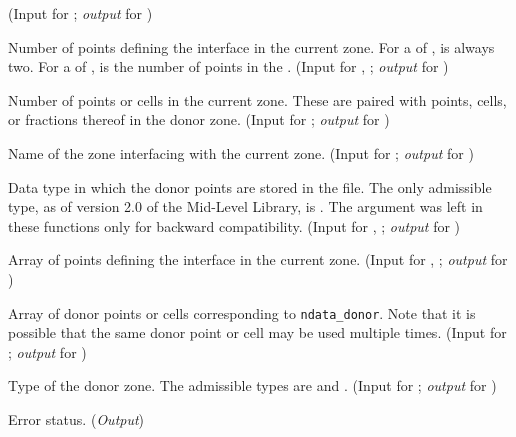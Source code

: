\begin{Ventryi}{}
      (\textcolor{input}{Input} for ;
      \textcolor{output}{\textit{output}} for )
\item [\fort{npnts}]
      Number of points defining the interface in the current zone.
      For a  of , 
      is always two.
      For a  of ,  is
      the number of points in the .
      (\textcolor{input}{Input} for ,
      ;
      \textcolor{output}{\textit{output}} for )
\item [\fort{ndata\_donor}]
      Number of points or cells in the current zone.
      These are paired with points, cells, or fractions thereof in the
      donor zone.
      (\textcolor{input}{Input} for ;
      \textcolor{output}{\textit{output}} for )
\item [\fort{donorname}]
      Name of the zone interfacing with the current zone.
      (\textcolor{input}{Input} for ;
      \textcolor{output}{\textit{output}} for )
\item [\fort{donor\_datatype}]
      Data type in which the donor points are stored in the file.
      The only admissible type, as of version 2.0 of the Mid-Level
      Library, is .
      The  argument was left in these functions
      only for backward compatibility.
      (\textcolor{input}{Input} for ,
      ;
      \textcolor{output}{\textit{output}} for )
\item [\fort{pnts}]
      Array of points defining the interface in the current zone.
      (\textcolor{input}{Input} for ,
      ;
      \textcolor{output}{\textit{output}} for )
\item [\fort{donor\_data}]
      Array of donor points or cells corresponding to
      \texttt{ndata\_donor}.
      Note that it is possible that the same donor point or cell may
      be used multiple times.
      (\textcolor{input}{Input} for ;
      \textcolor{output}{\textit{output}} for )
\item [\fort{donor\_zonetype}]
      Type of the donor zone.
      The admissible types are  and .
      (\textcolor{input}{Input} for ;
      \textcolor{output}{\textit{output}} for )
\item [\fort{ier}]
      Error status.
      (\textcolor{output}{\textit{Output}})
\end{Ventryi}

